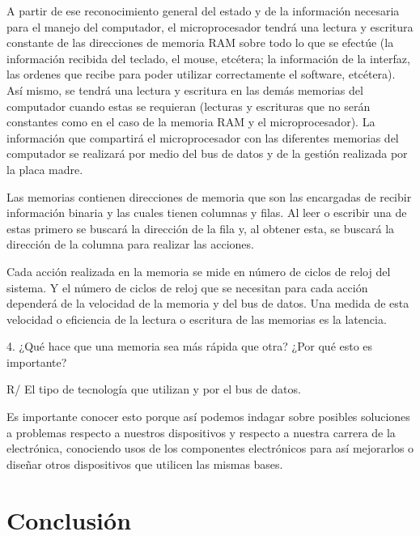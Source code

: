 \documentclass{article}
\begin{document}
A partir de ese reconocimiento general del estado y de la información necesaria para el manejo del computador, el microprocesador tendrá una lectura y escritura constante de las direcciones de memoria RAM sobre todo lo que se efectúe (la información recibida del teclado, el mouse, etcétera; la información de la interfaz, las ordenes que recibe para poder utilizar correctamente el software, etcétera). Así mismo, se tendrá una lectura y escritura en las demás memorias del computador cuando estas se requieran (lecturas y escrituras que no serán constantes como en el caso de la memoria RAM y el microprocesador). La información que compartirá el microprocesador con las diferentes memorias del computador se realizará por medio del bus de datos y de la gestión realizada por la placa madre.

Las memorias contienen direcciones de memoria que son las encargadas de recibir información binaria y las cuales tienen columnas y filas. Al leer o escribir una de estas primero se buscará la dirección de la fila y, al obtener esta, se buscará la dirección de la columna para realizar las acciones.

Cada acción realizada en la memoria se mide en número de ciclos de reloj del sistema. Y el número de ciclos de reloj que se necesitan para cada acción dependerá de la velocidad de la memoria y del bus de datos. Una medida de esta velocidad o eficiencia de la lectura o escritura de las memorias es la latencia.


\vspace{0.5cm}
4. ¿Qué hace que una memoria sea más rápida que otra? ¿Por qué esto es importante?

R/ El tipo de tecnología que utilizan y por el bus de datos.

Es importante conocer esto porque así podemos indagar sobre posibles soluciones a problemas respecto a nuestros dispositivos  y respecto a nuestra carrera de la electrónica, conociendo usos de los componentes electrónicos para así mejorarlos o diseñar otros dispositivos que utilicen las mismas bases.



\vspace{0.5cm}








\section{Conclusión} \label{conclulsion}



\end{document}
